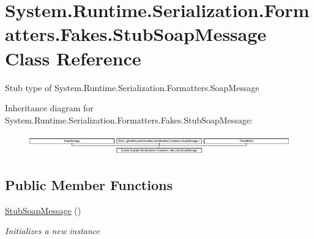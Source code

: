 \hypertarget{class_system_1_1_runtime_1_1_serialization_1_1_formatters_1_1_fakes_1_1_stub_soap_message}{\section{System.\-Runtime.\-Serialization.\-Formatters.\-Fakes.\-Stub\-Soap\-Message Class Reference}
\label{class_system_1_1_runtime_1_1_serialization_1_1_formatters_1_1_fakes_1_1_stub_soap_message}
}


Stub type of System.\-Runtime.\-Serialization.\-Formatters.\-Soap\-Message 


Inheritance diagram for System.\-Runtime.\-Serialization.\-Formatters.\-Fakes.\-Stub\-Soap\-Message\-:\begin{figure}[H]
\begin{center}
\leavevmode
\includegraphics[height=0.891010cm]{class_system_1_1_runtime_1_1_serialization_1_1_formatters_1_1_fakes_1_1_stub_soap_message}
\end{center}
\end{figure}
\subsection*{Public Member Functions}
\begin{DoxyCompactItemize}
\item 
\hyperlink{class_system_1_1_runtime_1_1_serialization_1_1_formatters_1_1_fakes_1_1_stub_soap_message_a6b3ee227b61f357d4bb3e643480021be}{Stub\-Soap\-Message} ()
\begin{DoxyCompactList}\small\item\em Initializes a new instance\end{DoxyCompactList}\end{DoxyCompactItemize}
